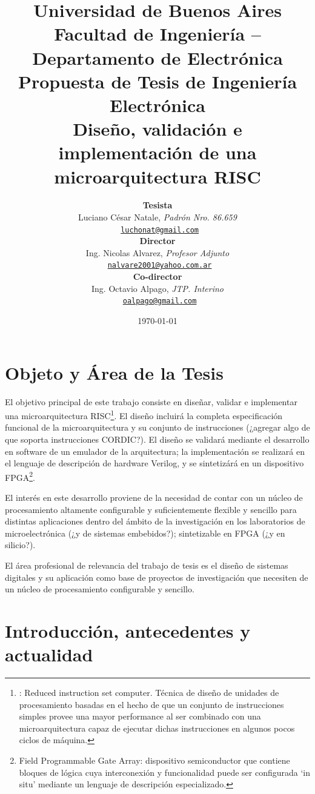 \documentclass[a4paper]{article}
\title{
	{\normalsize
		Universidad de Buenos Aires\\
		Facultad de Ingeniería -- Departamento de Electrónica\\
		Propuesta de Tesis de Ingeniería Electrónica\\
		\vspace{0.7cm}
	}
	Diseño, validación e implementación de una microarquitectura RISC
}
\author{	\textbf{Tesista}															\\
			Luciano César Natale, \textit{Padrón Nro. 86.659}               			\\
            \texttt{ \href{mailto:luchonat@gmail.com}{luchonat@gmail.com}}			\\[2.5ex]
            \textbf{Director}																\\
            Ing. Nicolas Alvarez, \textit{Profesor Adjunto}             				\\
            \texttt{ \href{mailto:nalvare2001@yahoo.com.ar}{nalvare2001@yahoo.com.ar}}  \\[2.5ex]
            \textbf{Co-director}															\\
            Ing. Octavio Alpago, \textit{JTP. Interino}               					\\
            \texttt{ \href{mailto:oalpago@gmail.com}{oalpago@gmail.com}}                \\[2.5ex]
       }
\date{\today}
\begin{document}
\maketitle



\thispagestyle{fancy}

\section{Objeto y Área de la Tesis}

El objetivo principal de este trabajo consiste en diseñar, validar e implementar una microarquitectura RISC\footnote{\label{RISC}: Reduced instruction set computer. Técnica de diseño de unidades de procesamiento basadas en el hecho de que un conjunto de instrucciones simples provee una mayor performance al ser combinado con una microarquitectura capaz de ejecutar dichas instrucciones en algunos pocos ciclos de máquina.}. El diseño incluirá la completa especificación funcional de la microarquitectura y su conjunto de instrucciones (¿agregar algo de que soporta instrucciones CORDIC?). El diseño se validará mediante el desarrollo en software de un emulador de la arquitectura; la implementación se realizará en el lenguaje de descripción de hardware Verilog, y se sintetizárá en un dispositivo FPGA\footnote{\label{FPGA}Field Programmable Gate Array: dispositivo semiconductor que contiene bloques de lógica cuya interconexión y funcionalidad puede ser configurada `in situ' mediante un lenguaje de descripción especializado.}.

El interés en este desarrollo proviene de la necesidad de contar con un núcleo de procesamiento altamente configurable y suficientemente flexible y sencillo para distintas aplicaciones dentro del ámbito de la investigación en los laboratorios de microelectrónica (¿y de sistemas embebidos?); sintetizable en FPGA
(¿y en silicio?).

El área profesional de relevancia del trabajo de tesis es el diseño de sistemas digitales y su aplicación como base de proyectos de investigación que necesiten de un núcleo de procesamiento configurable y sencillo.

\newpage

\section{Introducción, antecedentes y actualidad}
\end{document}
